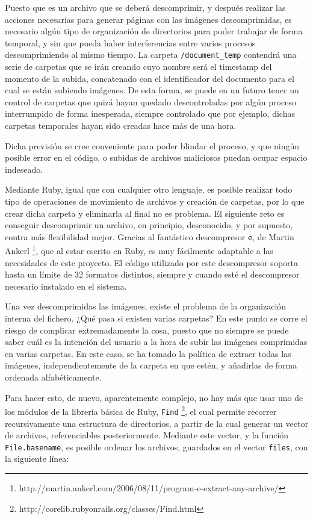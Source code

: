 Puesto que es un archivo que se deberá descomprimir, y después realizar las acciones necesarias para generar páginas con las imágenes descomprimidas, es necesario algún tipo de organización de directorios para poder trabajar de forma temporal, y sin que pueda haber interferencias entre varios procesos descomprimiendo al mismo tiempo. La carpeta \texttt{/document\_temp} contendrá una serie de carpetas que se irán creando cuyo nombre será el timestamp del momento de la subida, concatenado con el identificador del documento para el cual se están subiendo imágenes. De esta forma, se puede en un futuro tener un control de carpetas que quizá hayan quedado descontroladas por algún proceso interrumpido de forma inesperada, siempre controlado que por ejemplo, dichas carpetas temporales hayan sido creadas hace más de una hora.

Dicha previsión se cree conveniente para poder blindar el proceso, y que ningún posible error en el código, o subidas de archivos maliciosos puedan ocupar espacio indeseado.

Mediante Ruby, igual que con cualquier otro lenguaje, es posible realizar todo tipo de operaciones de movimiento de archivos y creación de carpetas, por lo que crear dicha carpeta y eliminarla al final no es problema. El siguiente reto es conseguir descomprimir un archivo, en principio, desconocido, y por supuesto, contra más flexibilidad mejor. Gracias al fantástico descompresor \texttt{e}, de Martin Ankerl \footnote{http://martin.ankerl.com/2006/08/11/program-e-extract-any-archive/}, que al estar escrito en Ruby, es muy fácilmente adaptable a las necesidades de este proyecto. El código utilizado por este descompresor soporta hasta un límite de 32 formatos distintos, siempre y cuando esté el descompresor necesario instalado en el sistema.

Una vez descomprimidas las imágenes, existe el problema de la organización interna del fichero. ¿Qué pasa si existen varias carpetas? En este punto se corre el riesgo de complicar extremadamente la cosa, puesto que no siempre se puede saber cuál es la intención del usuario a la hora de subir las imágenes comprimidas en varias carpetas. En este caso, se ha tomado la política de extraer todas las imágenes, independientemente de la carpeta en que estén, y añadirlas de forma ordenada alfabéticamente.

Para hacer esto, de nuevo, aparentemente complejo, no hay más que usar uno de los módulos de la librería básica de Ruby, \texttt{Find} \footnote{http://corelib.rubyonrails.org/classes/Find.html}, el cual permite recorrer recursivamente una estructura de directorios, a partir de la cual generar un vector de archivos, referenciables posteriormente. Mediante este vector, y la función \texttt{File.basename}, es posible ordenar los archivos, guardados en el vector \texttt{files}, con la siguiente línea:


